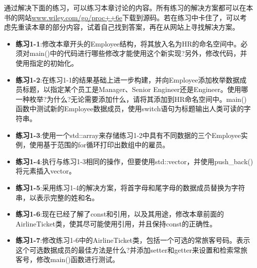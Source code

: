 通过解决下面的练习，可以练习本章讨论的内容。所有练习的解决方案都可以在本书的网站\url{www.wiley.com/go/proc++6e}下载到源码。若在练习中卡住了，可以考虑先重读本章的部分内容，试着自己找到答案，再在从网站上寻找解决方案。

\begin{itemize}
\item
\textbf{练习1-1}:修改本章开头的Employee结构，将其放入名为HR的命名空间中。必须对main()中的代码进行哪些修改才能使用这个新实现?另外，修改代码，并使用指定的初始化。

\item
\textbf{练习1-2}:在练习1-1的结果基础上进一步构建，并向Employee添加枚举数据成员标题，以指定某个员工是Manager、Senior Engineer还是Engineer。使用哪一种枚举?为什么?无论需要添加什么，请将其添加到HR命名空间中。main()函数中测试新的Employee数据成员，使用switch语句为标题输出人类可读的字符串。

\item
\textbf{练习1-3}:使用一个std::array来存储练习1-2中具有不同数据的三个Employee实例，使用基于范围的for循环打印出数组中的雇员。

\item
\textbf{练习1-4}:执行与练习1-3相同的操作，但要使用std::vector，并使用push\_back()将元素插入vector。

\item
\textbf{练习1-5}:采用练习1-4的解决方案，将首字母和尾字母的数据成员替换为字符串，以表示完整的姓和名。

\item
\textbf{练习1-6}:现在已经了解了const和引用，以及其用途，修改本章前面的AirlineTicket类，使其尽可能使用引用，并且保持const的正确性。

\item
\textbf{练习1-7}:修改练习1-6中的AirlineTicket类，包括一个可选的常旅客号码。表示这个可选数据成员的最佳方法是什么?并添加setter和getter来设置和检索常旅客号，修改main()函数进行测试。
\end{itemize}


